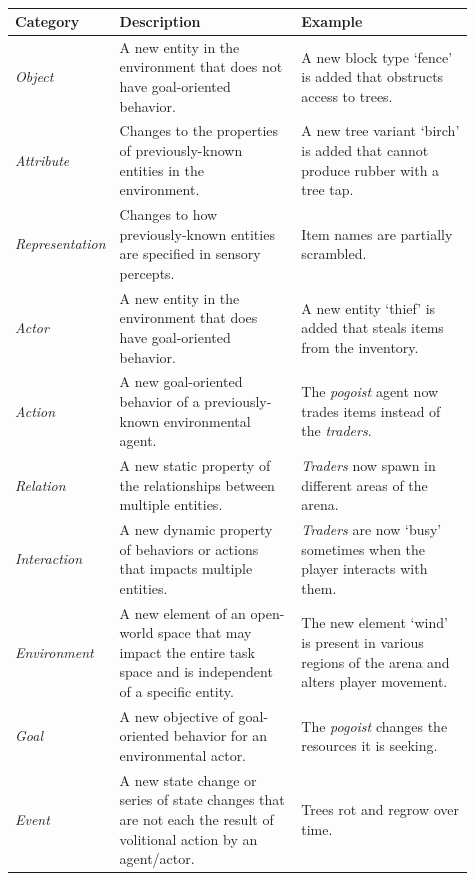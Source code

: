 \begin{table}[htbp]
    \centering
    \footnotesize
    \begin{tabular}{p{0.13\linewidth} p{0.4\linewidth} p{0.38\linewidth}}
    \toprule
    \textbf{Category}  & \textbf{Description} & \textbf{Example}\\
    \midrule
    \emph{Object} & A new entity in the environment that does not have goal-oriented behavior. & A new block type `fence' is added that obstructs access to trees. \\
    \midrule
    \emph{Attribute} & Changes to the properties of previously-known entities in the environment. & A new tree variant `birch' is added that cannot produce rubber with a tree tap. \\
    \midrule
    \emph{Representation} & Changes to how previously-known entities are specified in sensory percepts. & Item names are partially scrambled. \\
    \midrule
    \emph{Actor} & A new entity in the environment that does have goal-oriented behavior. & A new entity `thief' is added that steals items from the inventory. \\
    \midrule
    \emph{Action} & A new goal-oriented behavior of a previously-known environmental agent. & The \textit{pogoist} agent now trades items instead of the \textit{traders}. \\
    \midrule
    \emph{Relation} & A new static property of the relationships between multiple entities. & \textit{Traders} now spawn in different areas of the arena. \\
    \midrule
    \emph{Interaction} & A new dynamic property of behaviors or actions that impacts multiple entities. & \textit{Traders} are now `busy' sometimes when the player interacts with them. \\
    \midrule
    \emph{Environment} & A new element of an open-world space that may impact the entire task space and is independent of a specific entity. & The new element `wind' is present in various regions of the arena and alters player movement. \\
    \midrule
    \emph{Goal} & A new objective of goal-oriented behavior for an environmental actor. & The \textit{pogoist} changes the resources it is seeking. \\
    \midrule
    \emph{Event} & A new state change or series of state changes that are not each the result of volitional action by an agent/actor. & Trees rot and regrow over time. \\
    \bottomrule
    \end{tabular}
    \caption[Polycraft novelty categories]{}
    \label{tab:novelty_category}
\end{table}
